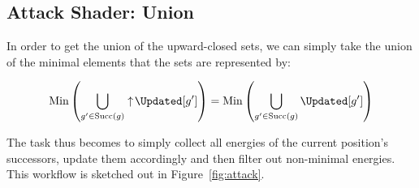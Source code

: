 \subsection{Attack Shader: Union}\label{subsec:attack_shader}

In order to get the union of the upward-closed sets,
we can simply take the union of the minimal elements
that the sets are represented by:

\[\mathrm{Min} \left( \bigcup_{g' \in \mathrm{Succ}(g)} \upclosed \Updated[g'] \right) =
  \mathrm{Min} \left( \bigcup_{g' \in \mathrm{Succ}(g)}           \Updated[g'] \right)\]

The task thus becomes to simply
collect all energies of the current position's successors,
update them accordingly
and then filter out non-minimal energies.
This workflow is sketched out in Figure~\ref{fig:attack}.

